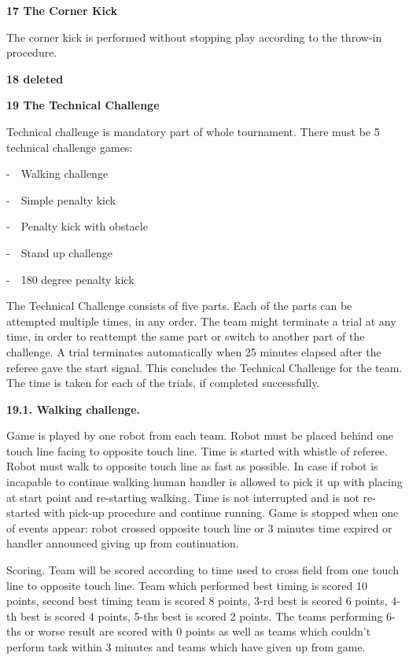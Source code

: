 \documentclass[a4paper]{article}
\begin{document}
\bigskip

\textbf{17 The Corner Kick}

The corner kick is performed without stopping play according to the throw-in procedure.

\bigskip

\textbf{18 deleted}

\bigskip

\textbf{19 The Technical Challenge}

Technical challenge is mandatory part of whole tournament. There must be 5 technical challenge games:

{}-\ \ Walking challenge

{}-\ \ Simple penalty kick

{}-\ \ Penalty kick with obstacle

{}-\ \ Stand up challenge

{}-\ \ 180 degree penalty kick

\bigskip

The Technical Challenge consists of five parts.
Each of the parts can be attempted multiple times, in any order.
The team might terminate a trial at any time,
in order to reattempt the same part or switch to another part of the challenge.
A trial terminates automatically when 25 minutes elapsed after the referee gave
the start signal.
This concludes the Technical Challenge for the team.
The time is taken for each of the trials, if completed successfully.

\bigskip

\textbf{19.1. Walking challenge.}

Game is played by one robot from each team. Robot must be placed behind one touch line facing to opposite touch line.
Time is started with whistle of referee. Robot must walk to opposite touch line as fast as possible. In case if robot
is incapable to continue walking human handler is allowed to pick it up with placing at start point and re-starting
walking. Time is not interrupted and is not re-started with pick-up procedure and continue running. Game is stopped
when one of events appear: robot crossed opposite touch line or 3 minutes time expired or handler announced giving up
from continuation. 

Scoring. Team will be scored according to time used to cross field from one touch line to opposite touch line. Team
which performed best timing is scored 10 points, second best timing team is scored 8 points, 3-rd best is scored 6
points, 4-th best is scored 4 points, 5-ths best is scored 2 points. The teams performing 6-ths or worse result are
scored with 0 points as well as teams which couldn’t perform task within 3 minutes and teams which have
given up from game. \ 
\end{document}
